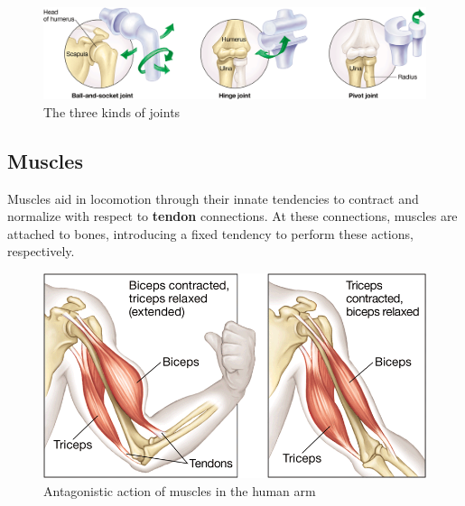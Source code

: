 \documentclass{article}
\begin{document}
\begin{figure}[h]
    \centering
    \includegraphics[width=\linewidth]{types_of_joints.png}
    \caption{The three kinds of joints}
\end{figure}

\subsection{Muscles}

Muscles aid in locomotion through their innate tendencies to contract and
normalize with respect to \textbf{tendon} connections. At these connections,
muscles are attached to bones, introducing a fixed tendency to perform these
actions, respectively.

\begin{figure}[h]
    \centering
    \includegraphics[width=0.75\linewidth]{muscle_action.png}
    \caption{Antagonistic action of muscles in the human arm}
\end{figure}
\end{document}

